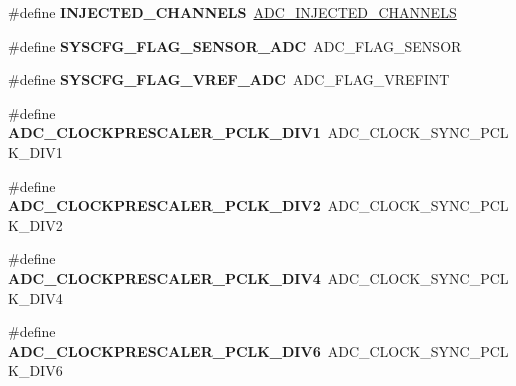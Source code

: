 \begin{DoxyCompactItemize}
\#define {\bfseries I\+N\+J\+E\+C\+T\+E\+D\+\_\+\+C\+H\+A\+N\+N\+E\+LS}~\mbox{\hyperlink{group___a_d_c__channels__type_ga6444b1539e8503ef3a2496ccf7eeb9fd}{A\+D\+C\+\_\+\+I\+N\+J\+E\+C\+T\+E\+D\+\_\+\+C\+H\+A\+N\+N\+E\+LS}}
\item 
\mbox{\label{group___h_a_l___a_d_c___aliased___defines_ga48929ac8156ee0ea52c25ad3ec9fed11}} 
\#define {\bfseries S\+Y\+S\+C\+F\+G\+\_\+\+F\+L\+A\+G\+\_\+\+S\+E\+N\+S\+O\+R\+\_\+\+A\+DC}~A\+D\+C\+\_\+\+F\+L\+A\+G\+\_\+\+S\+E\+N\+S\+OR
\item 
\mbox{\label{group___h_a_l___a_d_c___aliased___defines_gaa7f5151463037ce60032a869f3e71665}} 
\#define {\bfseries S\+Y\+S\+C\+F\+G\+\_\+\+F\+L\+A\+G\+\_\+\+V\+R\+E\+F\+\_\+\+A\+DC}~A\+D\+C\+\_\+\+F\+L\+A\+G\+\_\+\+V\+R\+E\+F\+I\+NT
\item 
\mbox{\label{group___h_a_l___a_d_c___aliased___defines_gaaf80e00044e185957328f1d59bacdf37}} 
\#define {\bfseries A\+D\+C\+\_\+\+C\+L\+O\+C\+K\+P\+R\+E\+S\+C\+A\+L\+E\+R\+\_\+\+P\+C\+L\+K\+\_\+\+D\+I\+V1}~A\+D\+C\+\_\+\+C\+L\+O\+C\+K\+\_\+\+S\+Y\+N\+C\+\_\+\+P\+C\+L\+K\+\_\+\+D\+I\+V1
\item 
\mbox{\label{group___h_a_l___a_d_c___aliased___defines_ga058aa1143f9f7f123362039c9efcf4cb}} 
\#define {\bfseries A\+D\+C\+\_\+\+C\+L\+O\+C\+K\+P\+R\+E\+S\+C\+A\+L\+E\+R\+\_\+\+P\+C\+L\+K\+\_\+\+D\+I\+V2}~A\+D\+C\+\_\+\+C\+L\+O\+C\+K\+\_\+\+S\+Y\+N\+C\+\_\+\+P\+C\+L\+K\+\_\+\+D\+I\+V2
\item 
\mbox{\label{group___h_a_l___a_d_c___aliased___defines_ga98bc3d5a9f7e069183a205c8458a6645}} 
\#define {\bfseries A\+D\+C\+\_\+\+C\+L\+O\+C\+K\+P\+R\+E\+S\+C\+A\+L\+E\+R\+\_\+\+P\+C\+L\+K\+\_\+\+D\+I\+V4}~A\+D\+C\+\_\+\+C\+L\+O\+C\+K\+\_\+\+S\+Y\+N\+C\+\_\+\+P\+C\+L\+K\+\_\+\+D\+I\+V4
\item 
\mbox{\label{group___h_a_l___a_d_c___aliased___defines_gae5cbf680825b9ccaa02bdbab9217f550}} 
\#define {\bfseries A\+D\+C\+\_\+\+C\+L\+O\+C\+K\+P\+R\+E\+S\+C\+A\+L\+E\+R\+\_\+\+P\+C\+L\+K\+\_\+\+D\+I\+V6}~A\+D\+C\+\_\+\+C\+L\+O\+C\+K\+\_\+\+S\+Y\+N\+C\+\_\+\+P\+C\+L\+K\+\_\+\+D\+I\+V6

\end{DoxyCompactItemize}
